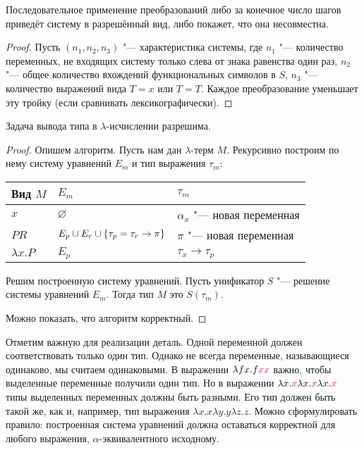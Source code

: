 \begin{statement}
    Последовательное применение преобразований либо за конечное число шагов приведёт систему в разрешённый вид,
    либо покажет, что она несовместна.
\end{statement}

\begin{proof}
    Пусть $(n_1, n_2, n_3)$ "--- характеристика системы, где
    $n_1$ "--- количество переменных, не входящих систему только слева от знака равенства один раз,
    $n_2$ "--- общее количество вхождений функциональных символов в $S$,
    $n_3$ "--- количество выражений вида $T=x$ или $T=T$.
    Каждое преобразование уменьшает эту тройку (если сравнивать лексикографически).
\end{proof}

\begin{theorem}
    Задача вывода типа в $\lambda$-исчислении разрешима.
\end{theorem}

\begin{proof}
    Опишем алгоритм. Пусть нам дан $\lambda$-терм $M$. Рекурсивно построим по нему систему уравнений $E_m$ и тип выражения $\tau_m$:
    \begin{center}
    \begin{tabular}{l l l} \toprule
        Вид $M$         & $E_m$                                                 & $\tau_m$                         \\ \midrule
        $x$             & $\varnothing$                                         & $\alpha_x$ "--- новая переменная \\ \midrule
        $PR$            & $E_p \cup E_r \cup \left\{\tau_p=\tau_r\to\pi\right\}$ & $\pi$ "--- новая переменная      \\ \midrule
        $\lambda x . P$ & $E_p$                                                 & $\tau_x\to\tau_p$        \\ \bottomrule
    \end{tabular}
    \end{center}
    Решим построенную систему уравнений.
    Пусть унификатор $S$ "--- решение системы уравнений $E_m$. Тогда тип $M$ это $S(\tau_m)$.

    Можно показать, что алгоритм корректный.
\end{proof}

Отметим важную для реализации деталь. Одной переменной должен соответствовать только один тип.
Однако не всегда переменные, называющиеся одинаково, мы считаем одинаковыми.
В выражении $\lambda f x . f \reduction x \reduction x$ важно, чтобы выделенные переменные получили один тип.
Но в выражении $\lambda x . \reduction x \lambda x . \reduction x \lambda x . \reduction x$ типы выделенных переменных должны быть разными.
Его тип должен быть такой же, как и, например, тип выражения $\lambda x . x \lambda y . y \lambda z . z$.
Можно сформулировать правило: построенная система уравнений должна оставаться корректной для любого выражения,
$\alpha$-эквивалентного исходному.

